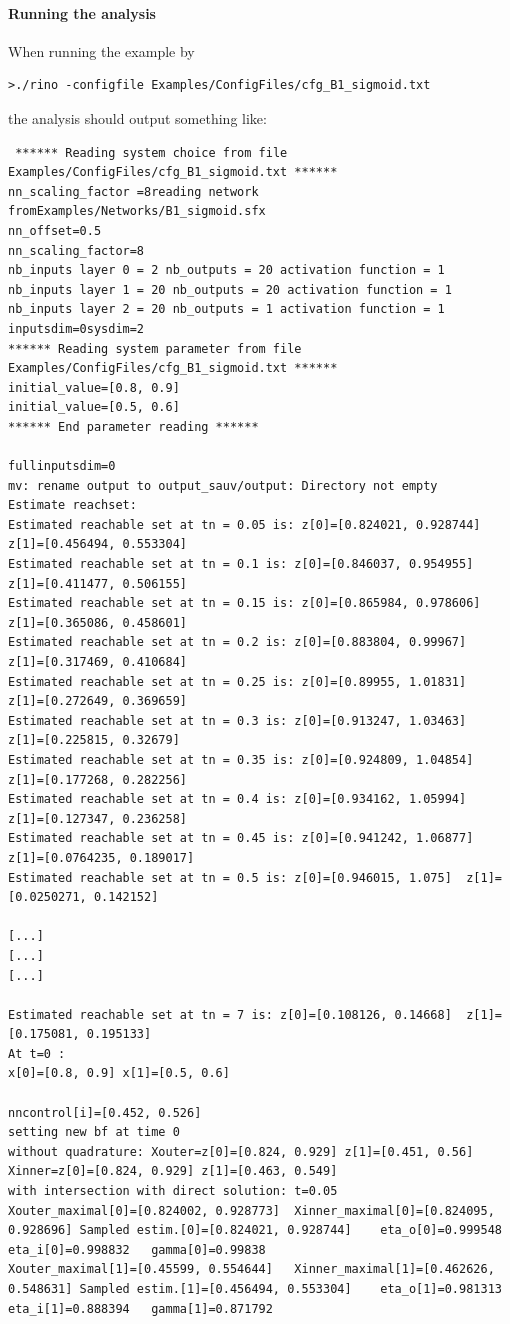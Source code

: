 \documentclass{article}
\begin{document}
\paragraph{Running the analysis}
When running the example by 
\begin{verbatim}
>./rino -configfile Examples/ConfigFiles/cfg_B1_sigmoid.txt
\end{verbatim}
the analysis should output something like:
\small
 \begin{verbatim}
 ****** Reading system choice from file Examples/ConfigFiles/cfg_B1_sigmoid.txt ******
nn_scaling_factor =8reading network fromExamples/Networks/B1_sigmoid.sfx
nn_offset=0.5
nn_scaling_factor=8
nb_inputs layer 0 = 2 nb_outputs = 20 activation function = 1
nb_inputs layer 1 = 20 nb_outputs = 20 activation function = 1
nb_inputs layer 2 = 20 nb_outputs = 1 activation function = 1
inputsdim=0sysdim=2
****** Reading system parameter from file Examples/ConfigFiles/cfg_B1_sigmoid.txt ******
initial_value=[0.8, 0.9]
initial_value=[0.5, 0.6]
****** End parameter reading ******

fullinputsdim=0
mv: rename output to output_sauv/output: Directory not empty
Estimate reachset:
Estimated reachable set at tn = 0.05 is: z[0]=[0.824021, 0.928744]  z[1]=[0.456494, 0.553304]  
Estimated reachable set at tn = 0.1 is: z[0]=[0.846037, 0.954955]  z[1]=[0.411477, 0.506155]  
Estimated reachable set at tn = 0.15 is: z[0]=[0.865984, 0.978606]  z[1]=[0.365086, 0.458601]  
Estimated reachable set at tn = 0.2 is: z[0]=[0.883804, 0.99967]  z[1]=[0.317469, 0.410684]  
Estimated reachable set at tn = 0.25 is: z[0]=[0.89955, 1.01831]  z[1]=[0.272649, 0.369659]  
Estimated reachable set at tn = 0.3 is: z[0]=[0.913247, 1.03463]  z[1]=[0.225815, 0.32679]  
Estimated reachable set at tn = 0.35 is: z[0]=[0.924809, 1.04854]  z[1]=[0.177268, 0.282256]  
Estimated reachable set at tn = 0.4 is: z[0]=[0.934162, 1.05994]  z[1]=[0.127347, 0.236258]  
Estimated reachable set at tn = 0.45 is: z[0]=[0.941242, 1.06877]  z[1]=[0.0764235, 0.189017]  
Estimated reachable set at tn = 0.5 is: z[0]=[0.946015, 1.075]  z[1]=[0.0250271, 0.142152]  

[...]
[...]
[...]

Estimated reachable set at tn = 7 is: z[0]=[0.108126, 0.14668]  z[1]=[0.175081, 0.195133]  
At t=0 :
x[0]=[0.8, 0.9]	x[1]=[0.5, 0.6]	

nncontrol[i]=[0.452, 0.526]
setting new bf at time 0
without quadrature: Xouter=z[0]=[0.824, 0.929] z[1]=[0.451, 0.56] 
Xinner=z[0]=[0.824, 0.929] z[1]=[0.463, 0.549] 
with intersection with direct solution: t=0.05
Xouter_maximal[0]=[0.824002, 0.928773] 	Xinner_maximal[0]=[0.824095, 0.928696] Sampled estim.[0]=[0.824021, 0.928744] 	 eta_o[0]=0.999548	 eta_i[0]=0.998832	 gamma[0]=0.99838
Xouter_maximal[1]=[0.45599, 0.554644] 	Xinner_maximal[1]=[0.462626, 0.548631] Sampled estim.[1]=[0.456494, 0.553304] 	 eta_o[1]=0.981313	 eta_i[1]=0.888394	 gamma[1]=0.871792


\end{verbatim}
\end{document}
